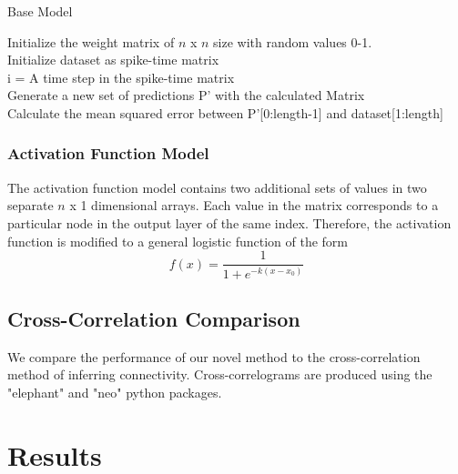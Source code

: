 \documentclass[11pt]{article}
\begin{document}
\begin{algorithm}
	\caption{Base Model}
	Initialize the weight matrix of $n$ x $n$ size with random values 0-1.\\
	Initialize dataset as spike-time matrix\\
	i = A time step in the spike-time matrix\\
	Generate a new set of predictions P' with the calculated Matrix\\
	Calculate the mean squared error between P'[0:length-1] and dataset[1:length]
\end{algorithm}

\subsubsection{Activation Function Model}
The activation function model contains two additional sets of values in two separate $n$ x 1 dimensional arrays. Each value in the matrix corresponds to a particular node in the output layer of the same index. Therefore, the activation function is modified to a general logistic function of the form $$ f(x) = \frac{1}{1+e^{-k(x - x_0)}}$$

\subsection{Cross-Correlation Comparison}
We compare the performance of our novel method to the cross-correlation method of inferring connectivity. Cross-correlograms are produced using the "elephant" and "neo" python packages.

\section{Results}
\end{document}
